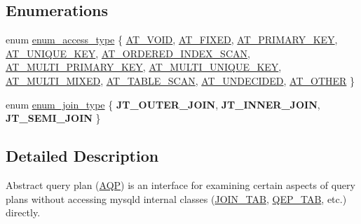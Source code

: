 \subsection*{Enumerations}
\begin{DoxyCompactItemize}
\item 
enum \mbox{\hyperlink{namespaceAQP_a4aaae4a1dc295a865368c9822d4dd0a5}{enum\+\_\+access\+\_\+type}} \{ \newline
\mbox{\hyperlink{namespaceAQP_a4aaae4a1dc295a865368c9822d4dd0a5af9d158d0883d15ad1551ecefd64e0c5a}{A\+T\+\_\+\+V\+O\+ID}}, 
\mbox{\hyperlink{namespaceAQP_a4aaae4a1dc295a865368c9822d4dd0a5abb6491cbaa915cb0e45a3f0c5cb84c0c}{A\+T\+\_\+\+F\+I\+X\+ED}}, 
\mbox{\hyperlink{namespaceAQP_a4aaae4a1dc295a865368c9822d4dd0a5a73c2bc147a4868f2cb7b95980e11c561}{A\+T\+\_\+\+P\+R\+I\+M\+A\+R\+Y\+\_\+\+K\+EY}}, 
\mbox{\hyperlink{namespaceAQP_a4aaae4a1dc295a865368c9822d4dd0a5a225031e143434de790e00c6d421130cf}{A\+T\+\_\+\+U\+N\+I\+Q\+U\+E\+\_\+\+K\+EY}}, 
\newline
\mbox{\hyperlink{namespaceAQP_a4aaae4a1dc295a865368c9822d4dd0a5a34f5c8d4f66ba61904e1ba12a97c5896}{A\+T\+\_\+\+O\+R\+D\+E\+R\+E\+D\+\_\+\+I\+N\+D\+E\+X\+\_\+\+S\+C\+AN}}, 
\mbox{\hyperlink{namespaceAQP_a4aaae4a1dc295a865368c9822d4dd0a5a46f728fe61227bf336b3f7b7c7ef0df0}{A\+T\+\_\+\+M\+U\+L\+T\+I\+\_\+\+P\+R\+I\+M\+A\+R\+Y\+\_\+\+K\+EY}}, 
\mbox{\hyperlink{namespaceAQP_a4aaae4a1dc295a865368c9822d4dd0a5a4d83346b5d11467d616f8c27c42ed9d5}{A\+T\+\_\+\+M\+U\+L\+T\+I\+\_\+\+U\+N\+I\+Q\+U\+E\+\_\+\+K\+EY}}, 
\mbox{\hyperlink{namespaceAQP_a4aaae4a1dc295a865368c9822d4dd0a5a4a79a6497d4de1d270db71641e83f6ea}{A\+T\+\_\+\+M\+U\+L\+T\+I\+\_\+\+M\+I\+X\+ED}}, 
\newline
\mbox{\hyperlink{namespaceAQP_a4aaae4a1dc295a865368c9822d4dd0a5ab088a8376ecb7637c5001bd4987508c9}{A\+T\+\_\+\+T\+A\+B\+L\+E\+\_\+\+S\+C\+AN}}, 
\mbox{\hyperlink{namespaceAQP_a4aaae4a1dc295a865368c9822d4dd0a5a9e9c8f946d0e4fd2ad7ab6b2006056fc}{A\+T\+\_\+\+U\+N\+D\+E\+C\+I\+D\+ED}}, 
\mbox{\hyperlink{namespaceAQP_a4aaae4a1dc295a865368c9822d4dd0a5af072c18eedd1c96cb1f56214d2fe1492}{A\+T\+\_\+\+O\+T\+H\+ER}}
 \}
\item 
enum \mbox{\hyperlink{namespaceAQP_a79358adf81977651643ef6c1672e18f8}{enum\+\_\+join\+\_\+type}} \{ {\bfseries J\+T\+\_\+\+O\+U\+T\+E\+R\+\_\+\+J\+O\+IN}, 
{\bfseries J\+T\+\_\+\+I\+N\+N\+E\+R\+\_\+\+J\+O\+IN}, 
{\bfseries J\+T\+\_\+\+S\+E\+M\+I\+\_\+\+J\+O\+IN}
 \}
\end{DoxyCompactItemize}


\subsection{Detailed Description}
Abstract query plan (\mbox{\hyperlink{namespaceAQP}{A\+QP}}) is an interface for examining certain aspects of query plans without accessing mysqld internal classes (\mbox{\hyperlink{classJOIN__TAB}{J\+O\+I\+N\+\_\+\+T\+AB}}, \mbox{\hyperlink{classQEP__TAB}{Q\+E\+P\+\_\+\+T\+AB}}, etc.) directly.

